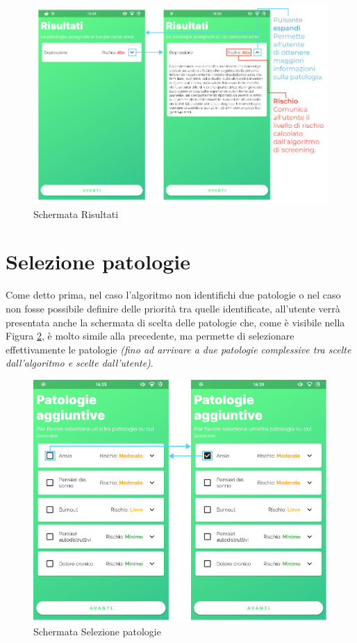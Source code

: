 \begin{figure}[h!]
\centering
\includegraphics[width=\textwidth]{img/risultati}
\caption{Schermata Risultati}
\label{fig:risultati}
\end{figure}

\newpage
\section{Selezione patologie}
Come detto prima, nel caso l'algoritmo non identifichi due patologie o nel caso non fosse possibile definire delle priorità tra quelle identificate, all'utente verrà presentata anche la schermata di scelta delle patologie che, come è visibile nella Figura \ref{fig:scelta_patologie}, è molto simile alla precedente, ma permette di selezionare effettivamente le patologie \textit{(fino ad arrivare a due patologie complessive tra scelte dall'algoritmo e scelte dall'utente)}.

\begin{figure}[h!]
\centering
\includegraphics[width=\textwidth]{img/scelta_patologie}
\caption{Schermata Selezione patologie}
\label{fig:scelta_patologie}
\end{figure}

